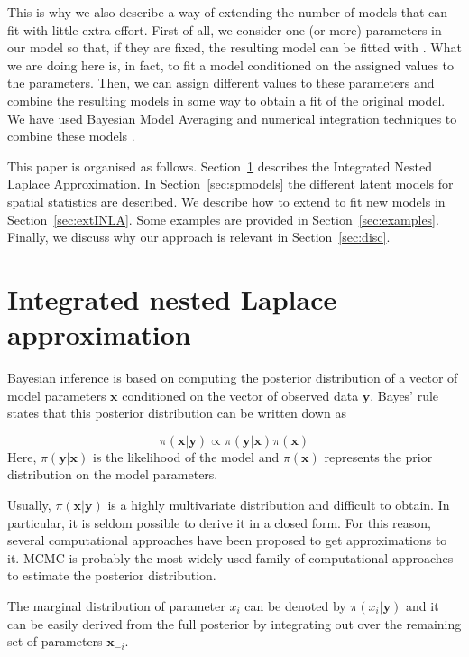 \documentclass[article]{jss}
\begin{document}
This is why we also describe a way of extending the number of models that
 can fit with little extra effort. First of all, we consider one
(or more) parameters in our model so that, if they are fixed, the resulting
model can be fitted with . What we are doing here is, in fact, to
fit a model conditioned on the assigned values to the parameters. Then, we can
assign different values to these parameters and combine the resulting models in
some way to obtain a fit of the original model. We have used Bayesian Model
Averaging and numerical integration techniques to combine these models \citep{Bivandetal:2014}.


This paper is organised as follows. Section~\ref{sec:INLA} describes the
Integrated Nested Laplace Approximation.  In Section~\ref{sec:spmodels} the
different latent models for spatial statistics are described.  We describe how
to extend  to fit new models in Section~\ref{sec:extINLA}. Some
examples are provided in Section~\ref{sec:examples}.  Finally, we discuss why
our approach is relevant in Section~\ref{sec:disc}.

\section{Integrated nested Laplace approximation}
\label{sec:INLA}

Bayesian inference is based on computing the posterior distribution of a
vector of model parameters $\mathbf{x}$ conditioned on the vector of observed
data $\mathbf{y}$. Bayes' rule states that this posterior distribution
can be written down as

\begin{equation}
\pi(\mathbf{x}|\mathbf{y}) \propto \pi(\mathbf{y}|\mathbf{x}) \pi(\mathbf{x})
\end{equation}
\noindent
Here, $\pi(\mathbf{y}|\mathbf{x})$ is the likelihood of the model and
$\pi(\mathbf{x})$ represents the prior distribution on the model parameters.


Usually, $\pi(\mathbf{x}|\mathbf{y})$ is a highly multivariate distribution
and difficult to obtain. In particular, it is seldom possible to derive it in
a closed form. For this reason, several computational approaches  have been 
proposed to get approximations to it. MCMC is probably the most widely used
family of computational approaches to estimate the posterior distribution.

The marginal distribution of parameter $x_i$ can be denoted by
$\pi(x_i|\mathbf{y})$ and it can be easily derived from the full posterior by
integrating out over the remaining set of parameters $\mathbf{x}_{-i}$.
\end{document}
